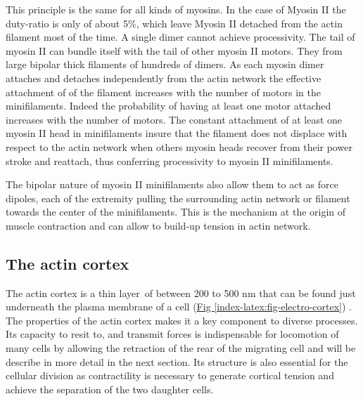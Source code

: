 \documentclass[A4paperpaper,11pt,english]{sphinxmanual}
\begin{document}
This principle is the same for all kinds of myosins. In the case of Myosin II
the duty-ratio is only of about 5\%, which leave Myosin II detached from the
actin filament most of the time. A single dimer cannot achieve
processivity.   The tail of myosin II can bundle itself with the tail of other
myosin II motors.  They from large bipolar thick filaments of hundreds of dimers.
As each myosin dimer attaches and detaches independently from the actin
network the effective attachment of of the filament increases with the number
of motors in the minifilaments. Indeed the probability of having at least one
motor attached increases with the number of motors. The constant attachment of
at least one myosin II head in minifilaments insure that the filament does not
displace with respect to the actin network when others myosin heads recover
from their power stroke and reattach, thus conferring processivity to myosin II
minifilaments.

The bipolar nature of myosin II minifilaments also allow them to act as force
dipoles, each  of the extremity pulling the surrounding actin network or
filament towards the center of the minifilaments. This is the mechanism at the
origin of muscle contraction and can allow to build-up tension in actin network.


\subsection{The actin cortex}
\label{index-latex:the-actin-cortex}
The actin cortex is a thin layer of between 200 to 500 nm that can be found
just underneath the plasma membrane of a cell (\hyperref[index-latex:fig-electro-cortex]{Fig  \ref*{index-latex:fig-electro-cortex}}) . The properties of the actin
cortex makes it a key component to diverse processes.  Its capacity to resit
to, and transmit forces is indispensable for locomotion of many cells by
allowing the retraction of the rear of the migrating cell and will be describe
in more detail in the next section. Its structure is also essential for the
cellular division as contractility is necessary to generate cortical tension
and achieve the separation of the two daughter cells.
\end{document}
